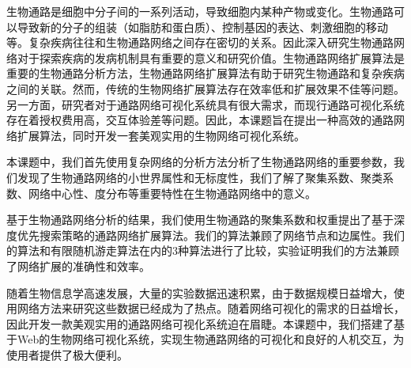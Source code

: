 \begin{cabstract}

生物通路是细胞中分子间的一系列活动，导致细胞内某种产物或变化。生物通路可以导致新的分子的组装（如脂肪和蛋白质）、控制基因的表达、刺激细胞的移动等。复杂疾病往往和生物通路网络之间存在密切的关系。因此深入研究生物通路网络对于探索疾病的发病机制具有重要的意义和研究价值。生物通路网络扩展算法是重要的生物通路分析方法，生物通路网络扩展算法有助于研究生物通路和复杂疾病之间的关联。然而，传统的生物网络扩展算法存在效率低和扩展效果不佳等问题。另一方面，研究者对于通路网络可视化系统具有很大需求，而现行通路可视化系统存在着授权费用高，交互体验差等问题。因此，本课题旨在提出一种高效的通路网络扩展算法，同时开发一套美观实用的生物网络可视化系统。

本课题中，我们首先使用复杂网络的分析方法分析了生物通路网络的重要参数，我们发现了生物通路网络的小世界属性和无标度性，我们了解了聚集系数、聚类系数、网络中心性、度分布等重要特性在生物通路网络中的意义。


基于生物通路网络分析的结果，我们使用生物通路的聚集系数和权重提出了基于深度优先搜索策略的通路网络扩展算法。我们的算法兼顾了网络节点和边属性。我们的算法和有限随机游走算法在内的3种算法进行了比较，实验证明我们的方法兼顾了网络扩展的准确性和效率。

随着生物信息学高速发展，大量的实验数据迅速积累，由于数据规模日益增大，使用网络方法来研究这些数据已经成为了热点。随着网络可视化的需求的日益增长，因此开发一款美观实用的通路网络可视化系统迫在眉睫。本课题中，我们搭建了基于Web的生物网络可视化系统，实现生物通路网络的可视化和良好的人机交互，为使用者提供了极大便利。

\end{cabstract}

